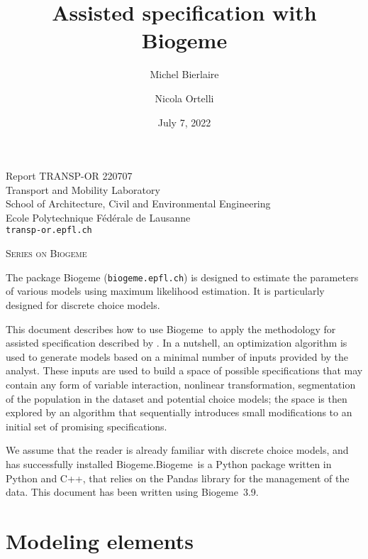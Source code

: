 \documentclass[12pt,a4paper]{article}
\title{Assisted specification with Biogeme}
\author{Michel Bierlaire \and Nicola Ortelli}
\date{July 7, 2022}
\newcommand{\PDBIOGEME}{Biogeme}
\begin{document}
\begin{titlepage}
  \pagestyle{empty}

  \maketitle
  \vspace{2cm}

  \begin{center}
    \small Report TRANSP-OR 220707 \\ Transport and Mobility Laboratory \\ School of Architecture, Civil and Environmental Engineering \\ Ecole Polytechnique F\'ed\'erale de Lausanne \\ \verb+transp-or.epfl.ch+
    \begin{center}
      \textsc{Series on Biogeme}
    \end{center}
  \end{center}


  \clearpage
\end{titlepage}


The package Biogeme (\texttt{biogeme.epfl.ch}) is designed to estimate
the parameters of various models using maximum likelihood
estimation. It is particularly designed for discrete choice
models.

This document describes how to use \PDBIOGEME\ to apply the
methodology for assisted specification described by
. In a nutshell, an optimization
algorithm is used to generate models based on a minimal
number of inputs provided by the analyst. These inputs are used to
build a space of possible specifications that may contain any form of
variable interaction, nonlinear transformation, segmentation of the
population in the dataset and potential choice models; the space is
then explored by an algorithm that sequentially introduces small
modifications to an initial set of promising specifications.

We assume that the reader is already familiar with discrete choice
models, and has successfully installed \PDBIOGEME.\@  \PDBIOGEME\ is
a Python package written in Python and C++, that relies on the
Pandas library for the management of the data.  This document has
been written using \PDBIOGEME\ 3.9.

\clearpage

\section{Modeling elements}
\end{document}
